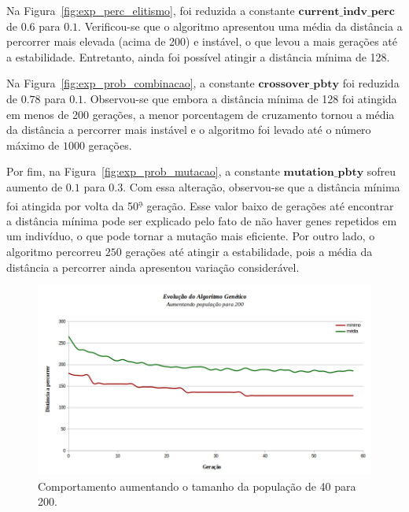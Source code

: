 Na Figura~\ref{fig:exp_perc_elitismo}, foi reduzida a constante $\mathbf{current\_indv\_perc}$ de $0.6$ para $0.1$. Verificou-se que o algoritmo apresentou uma média da distância a percorrer mais elevada (acima de 200) e instável, o que levou a mais gerações até a estabilidade. Entretanto, ainda foi possível atingir a distância mínima de 128.

Na Figura~\ref{fig:exp_prob_combinacao}, a constante $\mathbf{crossover\_pbty}$ foi reduzida de $0.78$ para $0.1$. Observou-se que embora a distância mínima de 128 foi atingida em menos de 200 gerações, a menor porcentagem de cruzamento tornou a média da distância a percorrer mais instável e o algoritmo foi levado até o número máximo de $1000$ gerações.

Por fim, na Figura~\ref{fig:exp_prob_mutacao}, a constante $\mathbf{mutation\_pbty}$ sofreu aumento de $0.1$ para $0.3$. Com essa alteração, observou-se que a distância mínima foi atingida por volta da 50\textsuperscript{\d a} geração. Esse valor baixo de gerações até encontrar a distância mínima pode ser explicado pelo fato de não haver genes repetidos em um indivíduo, o que pode tornar a mutação mais eficiente. Por outro lado, o algoritmo percorreu $250$ gerações até atingir a estabilidade, pois a média da distância a percorrer ainda apresentou variação considerável.

\begin{figure}[!h]
    \centering
    \includegraphics[width=\linewidth]{Imagens/sz_populacao=200.png}
    \caption{Comportamento aumentando o tamanho da população de 40 para 200.}
    \label{fig:exp_sz_populacao}
\end{figure}

